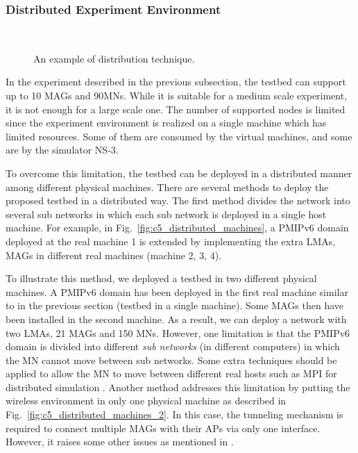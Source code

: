 \subsubsection{Distributed Experiment Environment}

\begin{figure}[h!]
\centering
{}\,
\caption[Near-to-real testbed: An example of the distributed experiment environment.]{An example of distribution technique.}
\label{fig:c5_distributed_machine}
\end{figure}

In the experiment described in the previous subsection, the testbed can support up to 10 MAGs and 90MNs. While it is suitable for a medium scale experiment, it is not enough for a large scale one. The number of supported nodes is limited since the experiment environment is realized on a single machine which has limited resources. Some of them are consumed by the virtual machines, and some are by the simulator NS-3.

To overcome this limitation, the testbed can be deployed in a distributed manner among different physical machines. There are several methods to deploy the proposed testbed in a distributed way. The first method divides the network into several sub networks in which each sub network is deployed in a single host machine. For example, in Fig.~\ref{fig:c5_distributed_machines}, a PMIPv6 domain deployed at the real machine 1 is extended by implementing the extra LMAs, MAGs in different real machines (machine 2, 3, 4). 

To illustrate this method, we deployed a testbed in two different physical machines. A PMIPv6 domain has been deployed in the first real machine similar to in the previous section (testbed in a single machine). Some MAGs then have been installed in the second machine. As a result, we can deploy a network with two LMAs, 21 MAGs and 150 MNs. However, one limitation is that the PMIPv6 domain is divided into different \textit{sub networks} (in different computers) in which the MN cannot move between sub networks. Some extra techniques should be applied to allow the MN to move between different real hosts such as MPI for distributed simulation \cite{MPI}. Another method addresses this limitation by putting the wireless environment in only one physical machine as described in Fig.~\ref{fig:c5_distributed_machines_2}. In this case, the tunneling mechanism is required to connect multiple MAGs with their APs via only one interface. However, it raises some other issues as mentioned in \cite{limitation_single_machine}. 

